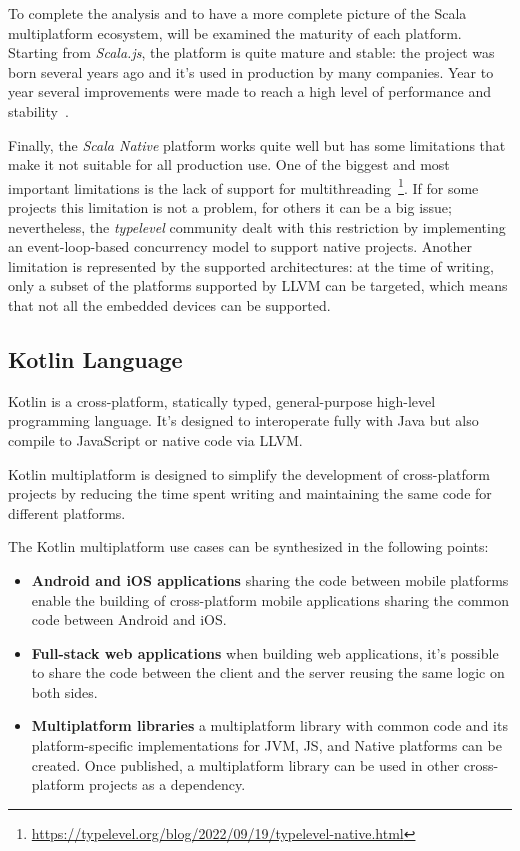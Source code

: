 To complete the analysis and to have a more complete picture of the Scala multiplatform ecosystem, will be examined the maturity of each platform.
Starting from \emph{Scala.js}, the platform is quite mature and stable: the project was born several years ago and it's used in production by many
companies. Year to year several improvements were made to reach a high level of performance and stability~\cite{marr2016cross}.

Finally, the \emph{Scala Native} platform works quite well but has some limitations that make it not suitable for all production use.
One of the biggest and most important limitations is the lack of support for multithreading~\footnote{\url{https://typelevel.org/blog/2022/09/19/typelevel-native.html}}.
If for some projects this limitation is not a problem, for others it can be a big issue; nevertheless, the \emph{typelevel} community dealt with this
restriction by implementing an event-loop-based concurrency model to support native projects.
Another limitation is represented by the supported architectures: at the time of writing, only a subset of the platforms supported by LLVM
can be targeted, which means that not all the embedded devices can be supported.

\subsection{Kotlin Language}
\label{sec:kotlin-language}

Kotlin is a cross-platform, statically typed, general-purpose high-level programming language.
It's designed to interoperate fully with Java but also compile to JavaScript or native code via LLVM.

Kotlin multiplatform is designed to simplify the development of cross-platform projects by reducing the time spent writing and maintaining the same
code for different platforms.

The Kotlin multiplatform use cases can be synthesized in the following points:
\begin{itemize}
	\item \textbf{Android and iOS applications} sharing the code between mobile platforms enable the building of cross-platform mobile applications
	      sharing the common code between Android and iOS.
	\item \textbf{Full-stack web applications} when building web applications, it's possible to share the code between the client and the server
	      reusing the same logic on both sides.
	\item \textbf{Multiplatform libraries} a multiplatform library with common code and its platform-specific implementations for JVM, JS, and Native platforms can be created. Once published, a multiplatform library can be used in other cross-platform projects as a dependency.
\end{itemize}

